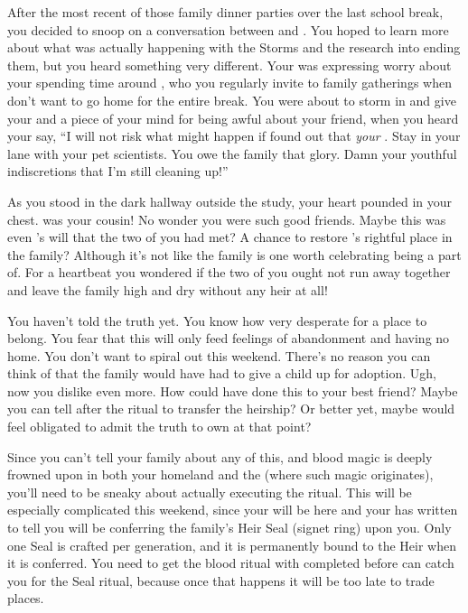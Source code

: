 \documentclass[char]{GL2020}
\begin{document}
After the most recent of those family dinner parties over the last school break, you decided to snoop on a conversation between \cDiplomat{} and \cFaledonParent{}. You hoped to learn more about what was actually happening with the Storms and the research into ending them, but you heard something very different. Your \cFaledonParent{\parent} was expressing worry about your \cDiplomat{\auncle} spending time around \cAmbition{}, who you regularly invite to family gatherings when \cAmbition{\they} don’t want to go home for the entire break. You were about to storm in and give your \cFaledonParent{\parent} and \cDiplomat{\auncle} a piece of your mind for being awful about your friend, when you heard your \cFaledonParent{\parent} say, “I will not risk what might happen if \cAmbition{} found out that \cAmbition{\they} \cAmbition{\are} \emph{your} \cAmbition{\offspring}. Stay in your lane with your pet scientists. You owe the family that glory. Damn your youthful indiscretions that I’m still cleaning up!” 

As you stood in the dark hallway outside the study, your heart pounded in your chest. \cAmbition{} was your cousin! No wonder you were such good friends. Maybe this was even \cTechGod{}’s will that the two of you had met? A chance to restore \cAmbition{}’s rightful place in the family? Although it’s not like the \cHeir{\formal} family is one worth celebrating being a part of.  For a heartbeat you wondered if the two of you ought not run away together and leave the \cHeir{\formal} family high and dry without any heir at all! 

You haven’t told \cAmbition{} the truth yet. You know how very desperate \cAmbition{\they \are} for a place to belong. You fear that this will only feed \cAmbition{\their} feelings of abandonment and having no home. You don’t want \cAmbition{} to spiral out this weekend. There’s no reason you can think of that the \cHeir{\formal} family would have had to give a child up for adoption. Ugh, now you dislike \cDiplomat{} even more. How could \cDiplomat{\they} have done this to your best friend? Maybe you can tell \cAmbition{} after the ritual to transfer the heirship? Or better yet, maybe \cDiplomat{} would feel obligated to admit the truth to \cDiplomat{\their} own \cAmbition{\child} at that point?  

Since you can’t tell your family about any of this, and blood magic is deeply frowned upon in both your homeland and the \pFarm{} (where such magic originates), you'll need to be sneaky about actually executing the ritual. This will be especially complicated this weekend, since your \cDiplomat{\auncle} will be here and your \cFaledonParent{\parent} has written to tell you \cDiplomat{\they} will be conferring the family's Heir Seal (signet ring) upon you. Only one Seal is crafted per generation, and it is permanently bound to the Heir when it is conferred. You need to get the blood ritual with \cAmbition{} completed before \cDiplomat{} can catch you for the Seal ritual, because once that happens it will be too late to trade places. 
\end{document}
